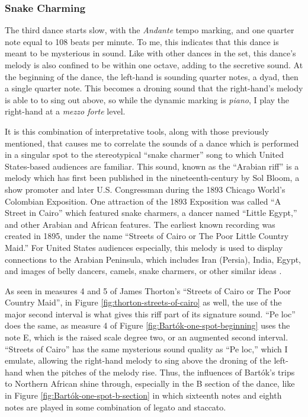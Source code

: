 \subsubsection{Snake Charming}

The third dance starts slow, with the \textit{Andante} tempo marking, and one quarter note equal to 108 beats per minute. To me, this indicates that this dance is meant to be mysterious in sound. Like with other dances in the set, this dance's melody is also confined to be within one octave, adding to the secretive sound. At the beginning of the dance, the left-hand is sounding quarter notes, a dyad, then a single quarter note. This becomes a droning sound that the right-hand's melody is able to to sing out above, so while the dynamic marking is \textit{piano}, I play the right-hand at a \textit{mezzo forte} level. 

It is this combination of interpretative tools, along with those previously mentioned, that causes me to correlate the sounds of a dance which is performed in a singular spot to the stereotypical ``snake charmer'' song to which United States-based audiences are familiar. This sound, known as the ``Arabian riff'' is a melody which has first been published in the nineteenth-century by Sol Bloom, a show promoter and later U.S. Congressman during the 1893 Chicago World's Colombian Exposition\autocite{Shira}. One attraction of the 1893 Exposition was called ``A Street in Cairo'' which featured snake charmers, a dancer named ``Little Egypt,'' and other Arabian and African features. The earliest known recording was created in 1895, under the name ``Streets of Cairo or The Poor Little Country Maid.'' For United States audiences especially, this melody is used to display connections to the Arabian Peninsula, which includes Iran (Persia), India, Egypt, and images of belly dancers, camels, snake charmers, or other similar ideas \autocite{Shira}.

As seen in measures 4 and 5 of James Thorton's ``Streets of Cairo or The Poor Country Maid'', in Figure \ref{fig:thorton-streets-of-cairo}\autocite{Thorton_1895} as well, the use of the major second interval is what gives this riff part of its signature sound. ``Pe loc'' does the same, as measure 4 of Figure \ref{fig:Bartók-one-spot-beginning}\autocite{Lung_2016} uses the note E\musSharp{}, which is the raised scale degree two, or an augmented second interval. ``Streets of Cairo'' has the same mysterious sound quality as ``Pe loc,'' which I emulate, allowing the right-hand melody to sing above the droning of the left-hand when the pitches of the melody rise. Thus, the influences of Bartók's trips to Northern African shine through, especially in the B section of the dance, like in Figure \ref{fig:Bartók-one-spot-b-section}\autocite{Lung_2016} in which sixteenth notes and eighth notes are played in some combination of legato and staccato.

